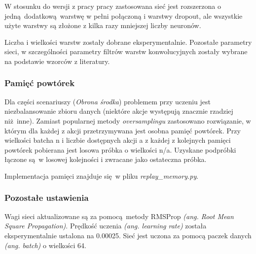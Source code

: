 W stosunku do wersji z pracy pracy \cite{DBLP:journals/corr/KempkaWRTJ16} zastosowana sieć jest rozszerzona o jedną dodatkową warstwę w pełni połączoną i warstwy dropout, ale wszystkie użyte warstwy są złożone z kilka razy mniejszej liczby neuronów.

Liczba i wielkości warstw zostały dobrane eksperymentalnie. Pozostałe parametry sieci, w szczególności parametry filtrów warstw konwolucyjnych zostały wybrane na podstawie wzorców z literatury.

\subsubsection{Pamięć powtórek}
Dla części scenariuszy (\textit{Obrona środka}) problemem przy uczeniu jest niezbalansowanie zbioru danych (niektóre akcje występują znacznie rzadziej niż inne). Zamiast popularnej metody \textit{oversamplingu} zastosowano rozwiązanie, w którym dla każdej z akcji przetrzymywana jest osobna pamięć powtórek. Przy wielkości batcha n i liczbie dostępnych akcji a z każdej z kolejnych pamięci powtórek 
pobierana jest losowa próbka o wielkości n/a. Uzyskane podpróbki łączone są w losowej kolejności i zwracane jako ostateczna próbka.

Implementacja pamięci znajduje się w pliku \textit{replay\_memory.py}.

\subsubsection{Pozostałe ustawienia}

Wagi sieci aktualizowane są za pomocą metody RMSProp \textit{(ang. Root Mean Square Propagation)}. Prędkość uczenia \textit{(ang. learning rate)} została eksperymentalnie ustalona na 0.00025. Sieć jest uczona za pomocą paczek danych \textit{(ang. batch)} o wielkości 64.










